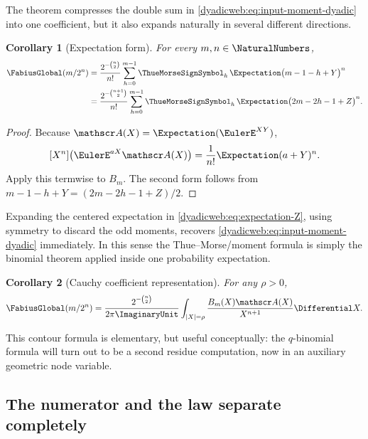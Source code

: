 \documentclass[11pt,oneside]{article}
\newtheorem{corollary}[corollary]{Corollary}
\theoremstyle{definition}
\theoremstyle{remark}
\begin{document}
The theorem compresses the double sum in \eqref{dyadicweb:eq:input-moment-dyadic} into one coefficient,
but it also expands naturally in several different directions.

\begin{corollary}[Expectation form]
\label{dyadicweb:cor:expectation-dyadic}
For every $m,n\in\NaturalNumbers$,
\begin{align}
 \FabiusGlobal(m/2^n)
 &=\frac{2^{-\binom n2}}{n!}
   \sum_{h=0}^{m-1}\ThueMorseSignSymbol_h\,
   \Expectation\bigl(m-1-h+Y\bigr)^n                              \label{dyadicweb:eq:expectation-Y}\\
 &=\frac{2^{-\binom{n+1}{2}}}{n!}
   \sum_{h=0}^{m-1}\ThueMorseSignSymbol_h\,
   \Expectation\bigl(2m-2h-1+Z\bigr)^n.                            \label{dyadicweb:eq:expectation-Z}
\end{align}
\end{corollary}

\begin{proof}
Because $\mathscr A(X)=\Expectation(\EulerE^{XY})$,
\[
 [X^n]\bigl(\EulerE^{aX}\mathscr A(X)\bigr)
 =\frac1{n!}\Expectation(a+Y)^n.
\]
Apply this termwise to $B_m$.  The second form follows from
$m-1-h+Y=(2m-2h-1+Z)/2$.
\end{proof}

Expanding the centered expectation in \eqref{dyadicweb:eq:expectation-Z}, using symmetry to discard the
odd moments, recovers \eqref{dyadicweb:eq:input-moment-dyadic} immediately.  In this sense the
Thue--Morse/moment formula is simply the binomial theorem applied inside one probability
expectation.

\begin{corollary}[Cauchy coefficient representation]
\label{dyadicweb:cor:cauchy-X}
For any $\rho>0$,
\begin{equation}
 \FabiusGlobal(m/2^n)
 =\frac{2^{-\binom n2}}{2\pi\ImaginaryUnit}
  \int_{|X|=\rho}\frac{B_m(X)\mathscr A(X)}{X^{n+1}}\Differential X. \label{dyadicweb:eq:cauchy-X}
\end{equation}
\end{corollary}

This contour formula is elementary, but useful conceptually: the $q$-binomial formula will
turn out to be a second residue computation, now in an auxiliary geometric node variable.

\subsection{The numerator and the law separate completely}
\end{document}
